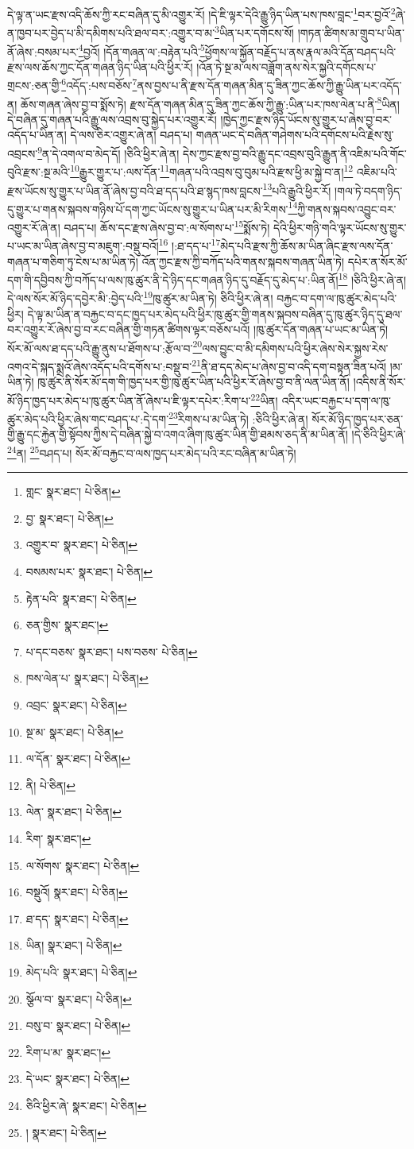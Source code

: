 དེ་ལྟ་ན་ཡང་རྫས་འདི་ཆོས་ཀྱི་རང་བཞིན་དུ་མི་འགྱུར་རོ། །དེ་ཇི་ལྟར་དེའི་རྒྱུ་ཉིད་ཡིན་པས་ཁས་བླང་\footnote{གླང་  སྣར་ཐང་།  པེ་ཅིན། }བར་བྱའོ་\footnote{བྱ་  སྣར་ཐང་།  པེ་ཅིན། }ཞེ་ན་ཁྱབ་པར་བྱེད་པ་མི་དམིགས་པའི་ཐལ་བར་:འགྱུར་བ་མ་\footnote{འགྱུར་བ་  སྣར་ཐང་།  པེ་ཅིན། }ཡིན་པར་དགོངས་སོ། །གཏན་ཚིགས་མ་གྲུབ་པ་ཡིན་ནོ་ཞེས་:བསམ་པར་\footnote{བསམས་པར་  སྣར་ཐང་།  པེ་ཅིན། }བྱའོ། །དོན་གཞན་ལ་:བརྟེན་པའི་\footnote{རྟེན་པའི་  སྣར་ཐང་།  པེ་ཅིན། }ཕྱོགས་ལ་སྐྱོན་བརྗོད་པ་ནས་རྣལ་མའི་དོན་བཤད་པའི་རྫས་ལས་ཆོས་ཀྱང་དོན་གཞན་ཉིད་ཡིན་པའི་ཕྱིར་རོ། །འོན་ཏེ་སྔ་མ་ལས་བཟློག་ནས་སེར་སྐྱའི་དགོངས་པ་གྲངས་:ཅན་གྱི་\footnote{ཅན་གྱིས་  སྣར་ཐང་། }འདོད་:པས་བཅོས་\footnote{པ་དང་བཅས་  སྣར་ཐང་། པས་བཅས་  པེ་ཅིན། }ནས་བྱས་པ་ནི་རྫས་དོན་གཞན་མིན་དུ་ཟིན་ཀྱང་ཆོས་ཀྱི་རྒྱུ་ཡིན་པར་འདོད་ན། ཆོས་གཞན་ཞེས་བྱ་བ་སྨོས་ཏེ། རྫས་དོན་གཞན་མིན་དུ་ཟིན་ཀྱང་ཆོས་ཀྱི་རྒྱུ་:ཡིན་པར་ཁས་ལེན་པ་ནི་\footnote{ཁས་ལེན་པ་  སྣར་ཐང་།  པེ་ཅིན། }ཡིན། དེ་བཞིན་དུ་གཞན་པའི་རྒྱུ་ལས་འབྲས་བུ་སྐྱེད་པར་འགྱུར་རོ། །ཁྱེད་ཀྱང་རྫས་ཉིད་ཡོངས་སུ་གྱུར་པ་ཞེས་བྱ་བར་འདོད་པ་ཡིན་ན། དེ་ལས་ཅིར་འགྱུར་ཞེ་ན། བཤད་པ། གཞན་ཡང་དེ་བཞིན་གཤེགས་པའི་དགོངས་པའི་རྗེས་སུ་འབྲངས་\footnote{འབྲང་  སྣར་ཐང་།  པེ་ཅིན། }ན་དེ་འགལ་བ་མེད་དོ། །ཅིའི་ཕྱིར་ཞེ་ན། དེས་ཀྱང་རྫས་བྱ་བའི་རྒྱུ་དང་འབྲས་བུའི་རྒྱུན་ནི་འཇིམ་པའི་གོང་བུའི་རྫས་:སྔ་མའི་\footnote{སྔ་མ་  སྣར་ཐང་།  པེ་ཅིན། }རྒྱུར་གྱུར་པ་:ལས་དོན་\footnote{ལ་དོན་  སྣར་ཐང་།  པེ་ཅིན། }གཞན་པའི་འབྲས་བུ་བུམ་པའི་རྫས་ཕྱི་མ་སྐྱེ་བ་ན།\footnote{ནི།  པེ་ཅིན། } འཇིམ་པའི་རྫས་ཡོངས་སུ་གྱུར་པ་ཡིན་ནོ་ཞེས་བྱ་བའི་ཐ་དད་པའི་ཐ་སྙད་ཁས་བླངས་\footnote{ལེན་  སྣར་ཐང་།  པེ་ཅིན། }པའི་རྒྱུའི་ཕྱིར་རོ། །གལ་ཏེ་བདག་ཉིད་དུ་གྱུར་པ་གནས་སྐབས་གཉིས་པོ་དག་ཀྱང་ཡོངས་སུ་གྱུར་པ་ཡིན་པར་མི་རིགས་\footnote{རིག་  སྣར་ཐང་། }ཀྱི་གནས་སྐབས་འབྱུང་བར་འགྱུར་རོ་ཞེ་ན། བཤད་པ། ཆོས་དང་རྫས་ཞེས་བྱ་བ་:ལ་སོགས་པ་\footnote{ལ་སོགས་  སྣར་ཐང་།  པེ་ཅིན། }སྨོས་ཏེ། དེའི་ཕྱིར་གཉི་གའི་ལྟར་ཡོངས་སུ་གྱུར་པ་ཡང་མ་ཡིན་ཞེས་བྱ་བ་མཇུག་:བསྡུ་བའོ།\footnote{བསྡུའོ།  སྣར་ཐང་།  པེ་ཅིན། } །:ཐ་དད་པ་\footnote{ཐ་དད་  སྣར་ཐང་།  པེ་ཅིན། }མེད་པའི་རྫས་ཀྱི་ཆོས་མ་ཡིན་ཞིང་རྫས་ལས་དོན་གཞན་པ་གཅིག་ཏུ་ངེས་པ་མ་ཡིན་ཏེ། འོན་ཀྱང་རྫས་ཀྱི་བཀོད་པའི་གནས་སྐབས་གཞན་ཡིན་ཏེ། དཔེར་ན་སོར་མོ་དག་གི་དབྱིབས་ཀྱི་བཀོད་པ་ལས་ཁུ་ཚུར་ནི་དེ་ཉིད་དང་གཞན་ཉིད་དུ་བརྗོད་དུ་མེད་པ་:ཡིན་ནོ།\footnote{ཡིན།  སྣར་ཐང་།  པེ་ཅིན། } །ཅིའི་ཕྱིར་ཞེ་ན། དེ་ལས་སོར་མོ་ཉིད་དབྱེར་མི་:བྱེད་པའི་\footnote{མེད་པའི་  སྣར་ཐང་།  པེ་ཅིན། }ཁུ་ཚུར་མ་ཡིན་ཏེ། ཅིའི་ཕྱིར་ཞེ་ན། བརྐྱང་བ་དག་ལ་ཁུ་ཚུར་མེད་པའི་ཕྱིར། དེ་ལྟ་མ་ཡིན་ན་བརྐྱང་བ་དང་ཁྱད་པར་མེད་པའི་ཕྱིར་ཁུ་ཚུར་གྱི་གནས་སྐབས་བཞིན་དུ་ཁུ་ཚུར་ཉིད་དུ་ཐལ་བར་འགྱུར་རོ་ཞེས་བྱ་བ་རང་བཞིན་གྱི་གཏན་ཚིགས་ལྟར་བཅོས་པའོ། །ཁུ་ཚུར་དོན་གཞན་པ་ཡང་མ་ཡིན་ཏེ། སོར་མོ་ལས་ཐ་དད་པའི་རྒྱུ་ནུས་པ་ཐོགས་པ་:རྩོལ་བ་\footnote{སྩོལ་བ་  སྣར་ཐང་།  པེ་ཅིན། }ལས་བྱུང་བ་མི་དམིགས་པའི་ཕྱིར་ཞེས་སེར་སྐྱས་རེས་འགའ་དེ་སྐད་སྨྲའོ་ཞེས་འདོད་པའི་དགོས་པ་:བསྡུ་བ་\footnote{བསུ་བ་  སྣར་ཐང་།  པེ་ཅིན། }ནི་ཐ་དད་མེད་པ་ཞེས་བྱ་བ་འདི་དག་བསྟན་ཟིན་པའོ། །མ་ཡིན་ཏེ། ཁུ་ཚུར་ནི་སོར་མོ་དག་གི་ཁྱད་པར་གྱི་ཁུ་ཚུར་ཡིན་པའི་ཕྱིར་རོ་ཞེས་བྱ་བ་ནི་ལན་ཡིན་ནོ། །འདིས་ནི་སོར་མོ་ཉིད་ཁྱད་པར་མེད་པ་ཁུ་ཚུར་ཡིན་ནོ་ཞེས་པ་ཇི་ལྟར་དཔེར་:རིག་པ་\footnote{རིག་པ་མ་  སྣར་ཐང་། }ཡིན། འདིར་ཡང་བརྐྱང་པ་དག་ལ་ཁུ་ཚུར་མེད་པའི་ཕྱིར་ཞེས་གང་བཤད་པ་:དེ་དག་\footnote{དེ་ཡང་  སྣར་ཐང་།  པེ་ཅིན། }རིགས་པ་མ་ཡིན་ཏེ། :ཅིའི་ཕྱིར་ཞེ་ན། སོར་མོ་ཉིད་ཁྱད་པར་ཅན་གྱི་རྒྱུ་དང་རྐྱེན་གྱི་སྟོབས་ཀྱིས་དེ་བཞིན་སྐྱེ་བ་འགའ་ཞིག་ཁུ་ཚུར་ཡིན་གྱི་ཐམས་ཅད་ནི་མ་ཡིན་ནོ། །དེ་ཅིའི་ཕྱིར་ཞེ་\footnote{ཅིའི་ཕྱིར་ཞེ་  སྣར་ཐང་།  པེ་ཅིན། }ན། \footnote{།    སྣར་ཐང་།  པེ་ཅིན། }བཤད་པ། སོར་མོ་བརྐྱང་བ་ལས་ཁྱད་པར་མེད་པའི་རང་བཞིན་མ་ཡིན་ཏེ། 